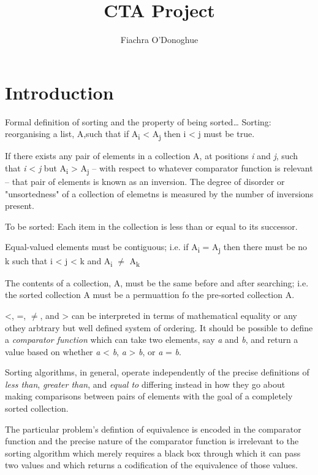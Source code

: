 \documentclass[12pt, a4paper]{article}
\title{CTA Project}
\author{Fiachra O'Donoghue}
\begin{document}
    
\section{Introduction}



Formal definition of sorting and the property of being sorted\dots
Sorting: reorganising a list, A,such that if A\textsubscript{i} < A\textsubscript{j} then i < j must be true.


If there exists any pair of elements in a collection A, at positions \emph{i} and \emph{j}, such that \emph{i} < \emph{j} but A\textsubscript{i} > A\textsubscript{j} -- with respect to whatever comparator function is relevant -- that pair of elements is known as an inversion. The degree of disorder or "unsortedness" of a collection of elemetns is measured by the number of inversions present.

To be sorted: Each item in the collection is less than or equal to its successor.

Equal-valued elements must be contiguous; i.e. if A\textsubscript{i} = A\textsubscript{j} then there must be no k such that i < j < k and A\textsubscript{i} $\ne$ A\textsubscript{k}

The contents of a collection, A, must be the same before and after searching; i.e. the sorted collection A must be a permuattion fo the pre-sorted collection A.

<, =, $\ne$, and > can be interpreted in terms of mathematical equality or any othey arbtrary but well defined system of ordering. It should be possible to define a \emph{comparator function} which can take two elements, say \emph{a} and \emph{b}, and return a value based on whether \emph{a} < \emph{b}, \emph{a} > \emph{b}, or \emph{a} = \emph{b}.

Sorting algorithms, in general, operate independently of the precise definitions of \emph{less than}, \emph{greater than}, and \emph{equal to} differing instead in how they go about making comparisons between pairs of elements with the goal of a completely sorted collection.

The particular problem's defintion of equivalence is encoded in the comparator function and the precise nature of the comparator function is irrelevant to the sorting algorithm which merely requires a black box through which it can pass two values and which returns a codification of the equivalence of those values.
\end{document}
